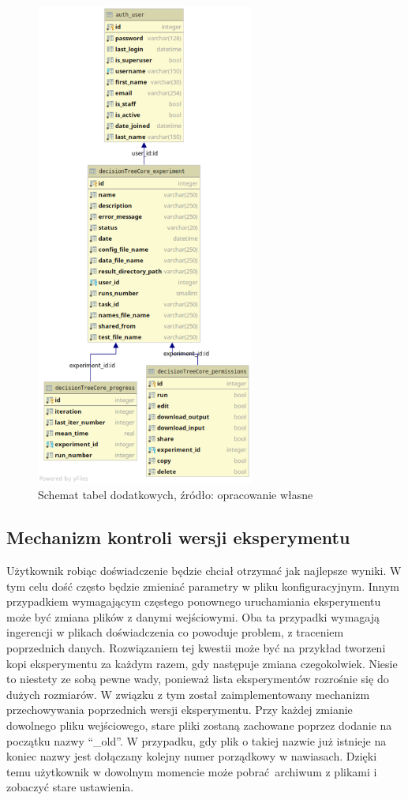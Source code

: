  
\begin{figure}[htb]
	\centering
	\includegraphics[height=16cm]{grafika/database_schema_2.eps}
	\caption{Schemat tabel dodatkowych, źródło: opracowanie własne}
	\label{rys6_database_schema}
\end{figure}


\subsection{Mechanizm kontroli wersji eksperymentu}
Użytkownik robiąc doświadczenie będzie chciał otrzymać jak najlepsze wyniki. W tym celu dość często będzie zmieniać parametry w pliku konfiguracyjnym. Innym przypadkiem wymagającym częstego ponownego uruchamiania eksperymentu może być zmiana plików z danymi wejściowymi. Oba ta przypadki wymagają ingerencji w plikach doświadczenia co powoduje problem, z traceniem poprzednich danych. Rozwiązaniem tej kwestii może być na przykład tworzeni kopi eksperymentu za każdym razem, gdy następuje zmiana czegokolwiek. Niesie to niestety ze sobą pewne wady, ponieważ lista eksperymentów rozrośnie się do dużych rozmiarów. W związku z tym został zaimplementowany mechanizm przechowywania poprzednich wersji eksperymentu. Przy każdej zmianie dowolnego pliku wejściowego, stare pliki zostaną zachowane poprzez dodanie na początku nazwy \enquote{\_old}. W przypadku, gdy plik o takiej nazwie już istnieje na koniec nazwy jest dołączany kolejny numer porządkowy w nawiasach. Dzięki temu użytkownik w dowolnym momencie może pobrać archiwum z plikami i zobaczyć stare ustawienia.

